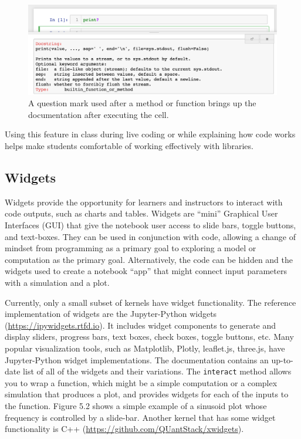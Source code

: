 \documentclass[]{book}
\begin{document}
\begin{figure}
\centering
\includegraphics{images/chapter50.png}
\caption{A question mark used after a method or function brings up the documentation after executing the cell.}
\end{figure}

Using this feature in class during live coding or
while explaining how code works helps make students comfortable
of working effectively with libraries.

\hypertarget{widgets}{%
\subsection{Widgets}\label{widgets}}

Widgets provide the opportunity for learners and instructors to
interact with code outputs, such as charts and tables.
Widgets are ``mini''
Graphical User Interfaces (GUI) that give the notebook user access to
slide bars, toggle buttons, and text-boxes. They can be used in
conjunction with code, allowing a change of mindset from programming
as a primary goal to exploring a model or computation as the primary
goal. Alternatively, the code can be hidden and the widgets used to
create a notebook ``app'' that might connect input parameters with a
simulation and a plot.

Currently, only a small subset of kernels have widget
functionality. The reference implementation of widgets
are the Jupyter-Python widgets
(\url{https://ipywidgets.rtfd.io}). It
includes widget components to generate and display sliders, progress
bars, text boxes, check boxes, toggle buttons, etc. Many popular
visualization tools, such as Matplotlib, Plotly, leaflet.js, three.js,
have Jupyter-Python widget implementations. The documentation contains
an up-to-date list of all of the widgets and their
variations. The \texttt{interact} method allows you to
wrap a function, which might be a simple computation or a complex
simulation that produces a plot, and provides widgets for each of the
inputs to the function. Figure 5.2 shows a simple example of a sinusoid
plot whose frequency is controlled by a slide-bar. Another kernel that
has some widget functionality is C++
(\url{https://github.com/QUantStack/xwidgets}).
\end{document}
